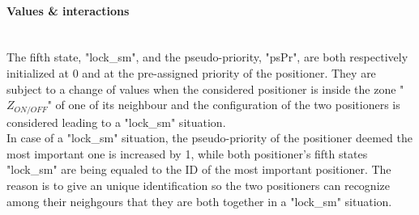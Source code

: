 \documentclass[]{spie}  %
\begin{document}
	\paragraph{Values \& interactions}\mbox{}\\
	The fifth state, "lock\_sm", and the pseudo-priority, "psPr", are both respectively initialized at 0 and at the pre-assigned priority of the positioner. They are subject to a change of values when the considered positioner is inside the zone "$Z_{ON/OFF}$" of one of its neighbour and the configuration of the two positioners is considered leading to a "lock\_sm" situation. \\
	In case of a "lock\_sm" situation, the pseudo-priority of the positioner deemed the most important one is increased by 1, while both positioner's fifth states "lock\_sm" are being equaled to the ID of the most important positioner. The reason is to give an unique identification so the two positioners can recognize among their neighgours that they are both together in a "lock\_sm" situation. 
	
	

\end{document}
